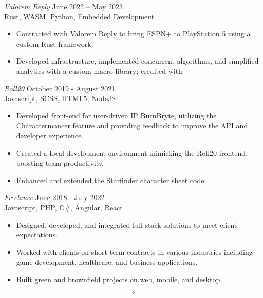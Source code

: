 \documentclass[10pt]{res} %
\begin{document}
\begin{resume}
	\vspace{4pt}
	{\sl Valorem Reply} \hfill June 2022 -- May 2023 \\
	Rust, WASM, Python, Embedded Development
	\begin{itemize}
		\itemsep -2pt %
			\item Contracted with Valorem Reply to bring ESPN+ to PlayStation 5 using a custom Rust framework.
			\item Developed infrastructure, implemented concurrent algorithms, and simplified analytics with a custom macro library; credited with 
	\end{itemize}

	\vspace{4pt}
	{\sl Roll20} \hfill October 2019 - August 2021 \\
	Javascript, SCSS, HTML5, NodeJS
	\begin{itemize}
		\itemsep -2pt %
		\item Developed front-end for user-driven IP BurnBryte, utilizing the Charactermancer feature and providing feedback to improve the API and developer experience.
		\item Created a local development environment mimicking the Roll20 frontend, boosting team productivity.
		\item Enhanced and extended the Starfinder character sheet code.
	\end{itemize}

	\vspace{4pt}
	{\sl Freelance} \hfill June 2018 - July 2022 \\
	Javascript, PHP, C\#, Angular, React
	\begin{itemize}
		\itemsep -2pt %
		\item Designed, developed, and integrated full-stack solutions to meet client expectations.
		\item Worked with clients on short-term contracts in various industries including game development, healthcare, and business applications.
		\item Built green and brownfield projects on web, mobile, and desktop.
	\end{itemize}

	$$\circ$$





\end{resume}
\end{document}

